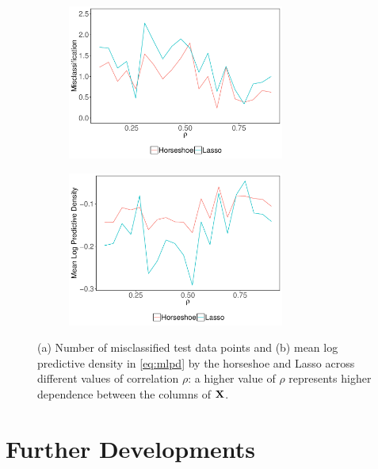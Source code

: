 \documentclass[sts,preprint]{imsart}
\begin{document}
\begin{figure}[t!]%
\begin{subfigure}[t]{0.45\linewidth}%
\includegraphics[height=2in,width=\columnwidth]{mp_hs_lasso_20_100_2_ideal_pars}%
\label{fig:4a}%
\end{subfigure}
\begin{subfigure}[t]{0.45\linewidth}%
\includegraphics[height=2in,width=\columnwidth]{mlpd_hs_lasso_20_100_2_ideal_pars}%
\label{fig:4b}%
\end{subfigure}
\caption{(a) Number of misclassified test data points and (b) mean log predictive
density in \eqref{eq:mlpd} by the horseshoe and Lasso across different values of correlation
$\rho$: a higher value of $\rho$ represents higher dependence between the columns of ${\bf X}$.}%
\label{fig:logistic}%
\end{figure}

\section{Further Developments}\label{sec:app-ext}

\end{document}
